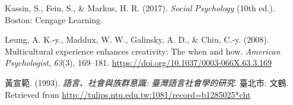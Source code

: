 \documentclass[oneside]{book}
\theoremstyle{definition}
\theoremstyle{definition}
\theoremstyle{definition}
\theoremstyle{remark}
\begin{document}
\hypertarget{refs}{}
\leavevmode\hypertarget{ref-kassin2017}{}%
Kassin, S., Fein, S., \& Markus, H. R. (2017). \emph{Social Psychology} (10th ed.). Boston: Cengage Learning.

\leavevmode\hypertarget{ref-leung2008}{}%
Leung, A. K.-y., Maddux, W. W., Galinsky, A. D., \& Chiu, C.-y. (2008). Multicultural experience enhances creativity: The when and how. \emph{American Psychologist}, \emph{63}(3), 169--181. \url{https://doi.org/10.1037/0003-066X.63.3.169}

\leavevmode\hypertarget{ref-huangxuanfan1993}{}%
黃宣範. (1993). \emph{語言、社會與族群意識: 臺灣語言社會學的研究}. 臺北市: 文鶴. Retrieved from \url{http://tulips.ntu.edu.tw:1081/record=b1285025*cht}
\end{document}
